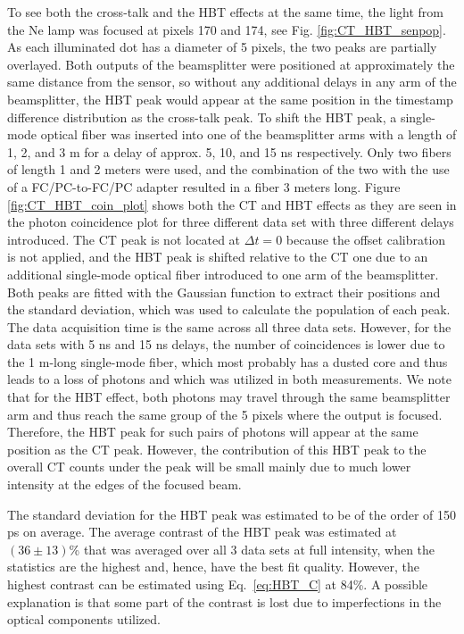 \documentclass[a4paper,11pt]{article}
\begin{document}
To see both the cross-talk and the HBT effects at the same time, the light from the Ne lamp was focused at pixels 170 and 174, see Fig. \ref{fig:CT_HBT_senpop}. As each illuminated dot has a diameter of 5 pixels, the two peaks are partially overlayed. Both outputs of the beamsplitter were positioned at approximately the same distance from the sensor, so without any additional delays in any arm of the beamsplitter, the HBT peak would appear at the same position in the timestamp difference distribution as the cross-talk peak. To shift the HBT peak, a single-mode optical fiber was inserted into one of the beamsplitter arms with a length of 1, 2, and 3 m for a delay of approx. 5, 10, and 15 ns respectively. Only two fibers of length 1 and 2 meters were used, and the combination of the two with the use of a FC/PC-to-FC/PC adapter resulted in a fiber 3 meters long. Figure \ref{fig:CT_HBT_coin_plot} shows both the CT and HBT effects as they are seen in the photon coincidence plot for three different data set with three different delays introduced. The CT peak is not located at $\Delta t=0$ because the offset calibration is not applied, and the HBT peak is shifted relative to the CT one due to an additional single-mode optical fiber introduced to one arm of the beamsplitter. Both peaks are fitted with the Gaussian function to extract their positions and the standard deviation, which was used to calculate the population of each peak. The data acquisition time is the same across all three data sets. However, for the data sets with 5 ns and 15 ns delays, the number of coincidences is lower due to the 1 m-long single-mode fiber, which most probably has a dusted core and thus leads to a loss of photons and which was utilized in both measurements. We note that for the HBT effect, both photons may travel through the same beamsplitter arm and thus reach the same group of the 5 pixels where the output is focused. Therefore, the HBT peak for such pairs of photons will appear at the same position as the CT peak. However, the contribution of this HBT peak to the overall CT counts under the peak will be small mainly due to much lower intensity at the edges of the focused beam.

The standard deviation for the HBT peak was estimated to be of the order of 150 ps on average. The average contrast of the HBT peak was estimated at $(36 \pm 13)$\% that was averaged over all 3 data sets at full intensity, when the statistics are the highest and, hence, have the best fit quality. However, the highest contrast can be estimated using Eq.~\eqref{eq:HBT_C} at 84\%. 
A possible explanation is that some part of the contrast is lost due to imperfections in the optical components utilized.
\end{document}
